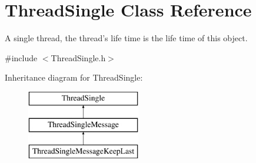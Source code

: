 \hypertarget{class_thread_single}{
\section{ThreadSingle Class Reference}
\label{class_thread_single}
}


A single thread, the thread's life time is the life time of this object.  




{\ttfamily \#include $<$ThreadSingle.h$>$}

Inheritance diagram for ThreadSingle:\begin{figure}[H]
\begin{center}
\leavevmode
\includegraphics[height=3.000000cm]{class_thread_single}
\end{center}
\end{figure}
